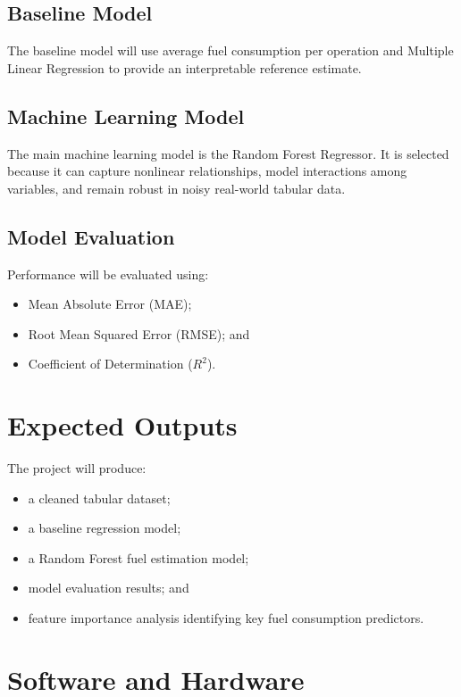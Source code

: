 \documentclass[11pt,twocolumn]{article}
\begin{document}
\subsection*{Baseline Model}

The baseline model will use average fuel consumption per operation and Multiple Linear Regression to provide an interpretable reference estimate.

\subsection*{Machine Learning Model}

The main machine learning model is the Random Forest Regressor. It is selected because it can capture nonlinear relationships, model interactions among variables, and remain robust in noisy real-world tabular data.

\subsection*{Model Evaluation}

Performance will be evaluated using:
\begin{itemize}
\item Mean Absolute Error (MAE);
\item Root Mean Squared Error (RMSE); and
\item Coefficient of Determination ($R^2$).
\end{itemize}

\section*{Expected Outputs}

The project will produce:
\begin{itemize}
\item a cleaned tabular dataset;
\item a baseline regression model;
\item a Random Forest fuel estimation model;
\item model evaluation results; and
\item feature importance analysis identifying key fuel consumption predictors.
\end{itemize}

\section*{Software and Hardware}
\end{document}

